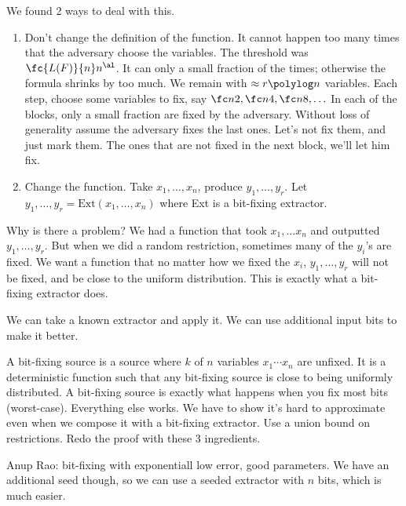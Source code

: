 We found 2 ways to deal with this.
\begin{enumerate}
\item
Don't change the definition of the function. %
It cannot happen too many times that the adversary choose the variables. The threshold was $\fc{L(F)}{n}n^\al$. %
It can only a small fraction of the times; otherwise the formula shrinks by too much.
We remain with $\approx r\polylog n$ variables. Each step, choose some variables to fix, say $\fc n2, \fc n4,\fc n8,\ldots$ In each of the blocks, only a small fraction are fixed by the adversary. Without loss of generality assume the adversary fixes the last ones. Let's not fix them, and just mark them. The ones that are not fixed in the next block, we'll let him fix.
\item
Change the function. Take $x_1,\ldots, x_n$, produce $y_1,\ldots, y_r$. %
Let $y_1,\ldots, y_r=\text{Ext}(x_1,\ldots, x_n)$ where Ext is a bit-fixing extractor. 
\end{enumerate}
Why is there a problem? We had a function that took $x_1,\ldots x_n$ and outputted $y_1,\ldots, y_r$. But when we did a random restriction, sometimes many of the $y_i$'s are fixed. We want a function that no matter how we fixed the $x_i$, $y_1,\ldots, y_r$ will not be fixed, and be close to the uniform distribution. This is exactly what a bit-fixing extractor does.

We can take a known extractor and apply it. We can use additional input bits to make it better.

A bit-fixing source is a source where $k$ of $n$ variables $x_1\cdots x_n$ are unfixed. It is a deterministic function such that any bit-fixing source is close to being uniformly distributed. A bit-fixing source is exactly what happens when you fix most bits (worst-case). Everything else works. We have to show it's hard to approximate even when we compose it with a bit-fixing extractor. Use a union bound on restrictions. 
Redo the proof with these 3 ingredients.


Anup Rao: bit-fixing with exponentiall low error, good parameters. We have an additional seed though, so we can use a seeded extractor with $n$ bits, which is much easier.

